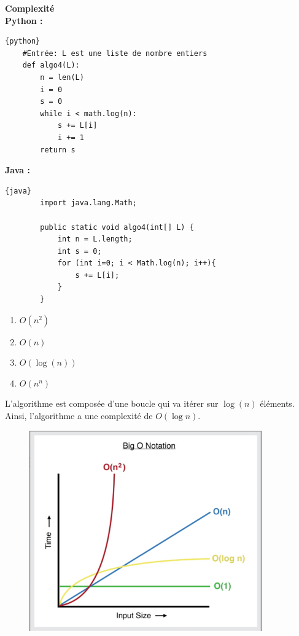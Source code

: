 \begin{Exercice}[10 minutes] \textbf{Complexité} \\

    \textbf{Python :}
    \begin{lstlisting}{python}
    #Entrée: L est une liste de nombre entiers
    def algo4(L):
        n = len(L)
        i = 0
        s = 0
        while i < math.log(n):
            s += L[i]
            i += 1
        return s
    \end{lstlisting}
    
    \textbf{Java :}
    \begin{lstlisting}{java}
        import java.lang.Math; 

        public static void algo4(int[] L) {
            int n = L.length;
            int s = 0;
            for (int i=0; i < Math.log(n); i++){
                s += L[i];
            }
        }
    \end{lstlisting}

    \begin{enumerate}
        \item $O(n^2)$
        \item $O(n)$
        \item $O(\log(n))$
        \item $O(n^n)$
    \end{enumerate}

    \begin{solution}
    L'algorithme est composée d'une boucle qui va itérer sur $\log(n)$ éléments. Ainsi,
    l'algorithme a une complexité de $O(\log n)$.
    \end{solution}

    \begin{figure}[h!]
        \centering
        \includegraphics[width=10cm]{ressources/complexity.png}
    \end{figure}

\end{Exercice}

